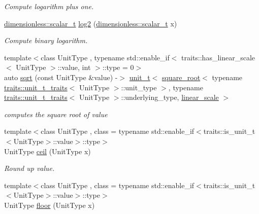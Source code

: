 \begin{DoxyCompactItemize}
\begin{DoxyCompactList}\small\item\em Compute logarithm plus one. \end{DoxyCompactList}\item 
\hyperlink{classunits_1_1unit__t}{dimensionless\+::scalar\+\_\+t} \hyperlink{group___unit_math_ga74cfc8bb50857982dc6eac6825295a0a}{log2} (\hyperlink{classunits_1_1unit__t}{dimensionless\+::scalar\+\_\+t} x)
\begin{DoxyCompactList}\small\item\em Compute binary logarithm. \end{DoxyCompactList}\item 
{\footnotesize template$<$class Unit\+Type , typename std\+::enable\+\_\+if$<$ traits\+::has\+\_\+linear\+\_\+scale$<$ Unit\+Type $>$\+::value, int $>$\+::type  = 0$>$ }\\auto \hyperlink{group___unit_math_gabfa4684a203331f788cf8294fdc25c7a}{sqrt} (const Unit\+Type \&value) -\/$>$ \hyperlink{classunits_1_1unit__t}{unit\+\_\+t}$<$ \hyperlink{group___unit_manipulators_ga66c5d3d0e80c7c3e56683d7df366b380}{square\+\_\+root}$<$ typename \hyperlink{structunits_1_1traits_1_1unit__t__traits}{traits\+::unit\+\_\+t\+\_\+traits}$<$ Unit\+Type $>$\+::unit\+\_\+type $>$, typename \hyperlink{structunits_1_1traits_1_1unit__t__traits}{traits\+::unit\+\_\+t\+\_\+traits}$<$ Unit\+Type $>$\+::underlying\+\_\+type, \hyperlink{structunits_1_1linear__scale}{linear\+\_\+scale} $>$
\begin{DoxyCompactList}\small\item\em computes the square root of {\itshape value} \end{DoxyCompactList}\item 
{\footnotesize template$<$class Unit\+Type , class  = typename std\+::enable\+\_\+if$<$traits\+::is\+\_\+unit\+\_\+t$<$\+Unit\+Type$>$\+::value$>$\+::type$>$ }\\Unit\+Type \hyperlink{group___unit_math_gac69d26861d77b33df6a8bdff8e3adcf9}{ceil} (Unit\+Type x)
\begin{DoxyCompactList}\small\item\em Round up value. \end{DoxyCompactList}\item 
{\footnotesize template$<$class Unit\+Type , class  = typename std\+::enable\+\_\+if$<$traits\+::is\+\_\+unit\+\_\+t$<$\+Unit\+Type$>$\+::value$>$\+::type$>$ }\\Unit\+Type \hyperlink{group___unit_math_ga510fabc531dbfe8ee911a4a255159bd0}{floor} (Unit\+Type x)

\end{DoxyCompactItemize}
